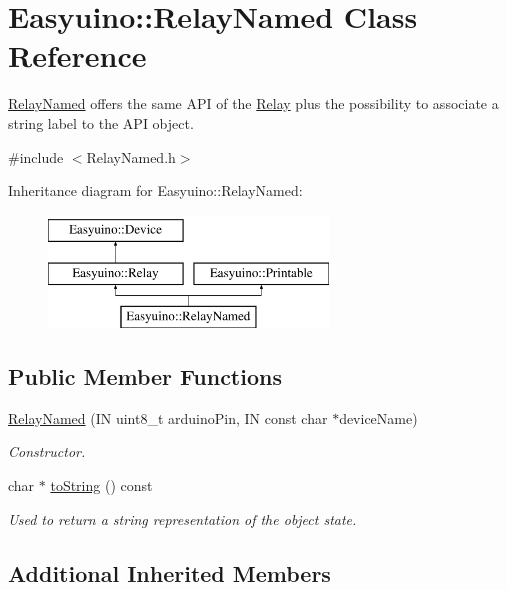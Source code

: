 \hypertarget{class_easyuino_1_1_relay_named}{}\section{Easyuino\+:\+:Relay\+Named Class Reference}
\label{class_easyuino_1_1_relay_named}


\hyperlink{class_easyuino_1_1_relay_named}{Relay\+Named} offers the same A\+PI of the \hyperlink{class_easyuino_1_1_relay}{Relay} plus the possibility to associate a string label to the A\+PI object.  




{\ttfamily \#include $<$Relay\+Named.\+h$>$}

Inheritance diagram for Easyuino\+:\+:Relay\+Named\+:\begin{figure}[H]
\begin{center}
\leavevmode
\includegraphics[height=3.000000cm]{class_easyuino_1_1_relay_named}
\end{center}
\end{figure}
\subsection*{Public Member Functions}
\begin{DoxyCompactItemize}
\item 
\hyperlink{class_easyuino_1_1_relay_named_a3def4eb321085beb48fa3e45da5e6dfc}{Relay\+Named} (IN uint8\+\_\+t arduino\+Pin, IN const char $\ast$device\+Name)
\begin{DoxyCompactList}\small\item\em Constructor. \end{DoxyCompactList}\item 
char $\ast$ \hyperlink{class_easyuino_1_1_relay_named_a1e9e82e563baaba5055ee9335551a306}{to\+String} () const
\begin{DoxyCompactList}\small\item\em Used to return a string representation of the object state. \end{DoxyCompactList}\end{DoxyCompactItemize}
\subsection*{Additional Inherited Members}


